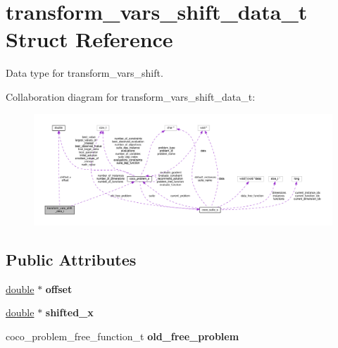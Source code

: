 \hypertarget{structtransform__vars__shift__data__t}{}\section{transform\+\_\+vars\+\_\+shift\+\_\+data\+\_\+t Struct Reference}
\label{structtransform__vars__shift__data__t}


Data type for transform\+\_\+vars\+\_\+shift.  




Collaboration diagram for transform\+\_\+vars\+\_\+shift\+\_\+data\+\_\+t\+:\nopagebreak
\begin{figure}[H]
\begin{center}
\leavevmode
\includegraphics[width=350pt]{structtransform__vars__shift__data__t__coll__graph}
\end{center}
\end{figure}
\subsection*{Public Attributes}
\begin{DoxyCompactItemize}
\item 
\hyperlink{classdouble}{double} $\ast$ {\bfseries offset}\hypertarget{structtransform__vars__shift__data__t_a1cb1f88ba4ce90b0b5318d53cb8ae096}{}\label{structtransform__vars__shift__data__t_a1cb1f88ba4ce90b0b5318d53cb8ae096}

\item 
\hyperlink{classdouble}{double} $\ast$ {\bfseries shifted\+\_\+x}\hypertarget{structtransform__vars__shift__data__t_add0cd2a3cb849a109b36623d1d8a16f5}{}\label{structtransform__vars__shift__data__t_add0cd2a3cb849a109b36623d1d8a16f5}

\item 
coco\+\_\+problem\+\_\+free\+\_\+function\+\_\+t {\bfseries old\+\_\+free\+\_\+problem}\hypertarget{structtransform__vars__shift__data__t_a9ecc402e7cfb74a5453c80c729a0663b}{}\label{structtransform__vars__shift__data__t_a9ecc402e7cfb74a5453c80c729a0663b}

\end{DoxyCompactItemize}


